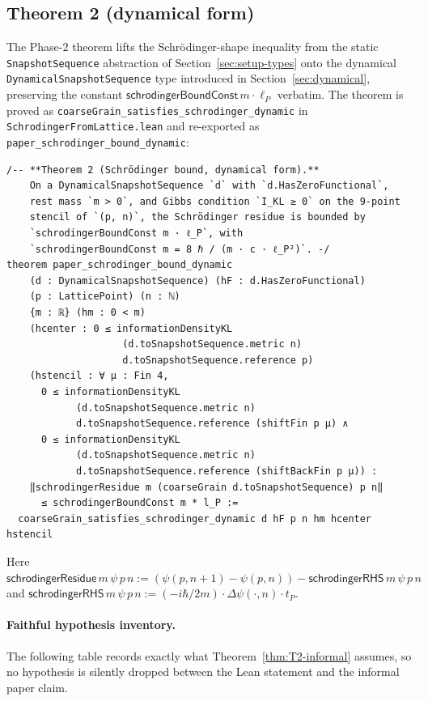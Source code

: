 \documentclass[11pt,a4paper,twoside]{article}
\theoremstyle{definition}
\newcommand{\lP}{\ell_P}
\newcommand{\tP}{t_P}
\newcommand{\code}[1]{\texttt{#1}}
\begin{document}
\subsection{Theorem 2 (dynamical form)}\label{sec:T2}

The Phase-2 theorem lifts the Schr\"odinger-shape inequality from the
static \code{SnapshotSequence} abstraction of
Section~\ref{sec:setup-types} onto the dynamical
\code{DynamicalSnapshotSequence} type introduced in
Section~\ref{sec:dynamical}, preserving the constant
$\mathsf{schrodingerBoundConst}\,m\cdot\lP$ verbatim. The theorem is
proved as \code{coarseGrain\_satisfies\_schrodinger\_dynamic} in
\code{SchrodingerFromLattice.lean} and re-exported as
\code{paper\_schrodinger\_bound\_dynamic}:

\begin{lstlisting}
/-- **Theorem 2 (Schrödinger bound, dynamical form).**
    On a DynamicalSnapshotSequence `d` with `d.HasZeroFunctional`,
    rest mass `m > 0`, and Gibbs condition `I_KL ≥ 0` on the 9-point
    stencil of `(p, n)`, the Schrödinger residue is bounded by
    `schrodingerBoundConst m · ℓ_P`, with
    `schrodingerBoundConst m = 8 ℏ / (m · c · ℓ_P²)`. -/
theorem paper_schrodinger_bound_dynamic
    (d : DynamicalSnapshotSequence) (hF : d.HasZeroFunctional)
    (p : LatticePoint) (n : ℕ)
    {m : ℝ} (hm : 0 < m)
    (hcenter : 0 ≤ informationDensityKL
                    (d.toSnapshotSequence.metric n)
                    d.toSnapshotSequence.reference p)
    (hstencil : ∀ μ : Fin 4,
      0 ≤ informationDensityKL
            (d.toSnapshotSequence.metric n)
            d.toSnapshotSequence.reference (shiftFin p μ) ∧
      0 ≤ informationDensityKL
            (d.toSnapshotSequence.metric n)
            d.toSnapshotSequence.reference (shiftBackFin p μ)) :
    ‖schrodingerResidue m (coarseGrain d.toSnapshotSequence) p n‖
      ≤ schrodingerBoundConst m * l_P :=
  coarseGrain_satisfies_schrodinger_dynamic d hF p n hm hcenter hstencil
\end{lstlisting}

Here
$\mathsf{schrodingerResidue}\,m\,\psi\,p\,n
:=(\psi(p,n{+}1)-\psi(p,n))-\mathsf{schrodingerRHS}\,m\,\psi\,p\,n$
and $\mathsf{schrodingerRHS}\,m\,\psi\,p\,n:=(-i\hbar/2m)\cdot\Delta\psi(\cdot,n)\cdot\tP$.

\paragraph{Faithful hypothesis inventory.}
The following table records exactly what Theorem~\ref{thm:T2-informal}
assumes, so no hypothesis is silently dropped between the Lean
statement and the informal paper claim.
\end{document}
